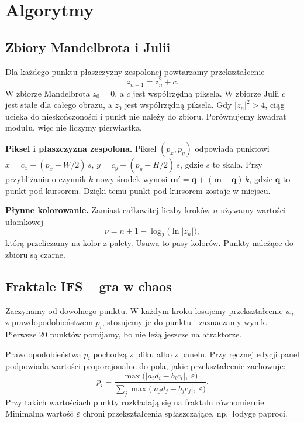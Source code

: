 \documentclass[11pt,a4paper]{article}
\begin{document}
\section{Algorytmy}

\subsection{Zbiory Mandelbrota i Julii}

Dla każdego punktu płaszczyzny zespolonej powtarzamy przekształcenie
\[
  z_{n+1} = z_n^2 + c .
\]
W zbiorze Mandelbrota $z_0 = 0$, a $c$ jest współrzędną piksela. W zbiorze
Julii $c$ jest stałe dla całego obrazu, a $z_0$ jest współrzędną piksela.
Gdy $|z_n|^2 > 4$, ciąg ucieka do nieskończoności i punkt nie należy do zbioru.
Porównujemy kwadrat modułu, więc nie liczymy pierwiastka.

\textbf{Piksel i płaszczyzna zespolona.} Piksel $(p_x, p_y)$ odpowiada
punktowi $x = c_x + (p_x - W/2)\,s$, $y = c_y - (p_y - H/2)\,s$, gdzie $s$ to
skala. Przy przybliżaniu o czynnik $k$ nowy środek wynosi
$\mathbf{m}' = \mathbf{q} + (\mathbf{m} - \mathbf{q})\,k$, gdzie $\mathbf{q}$
to punkt pod kursorem. Dzięki temu punkt pod kursorem zostaje w miejscu.

\textbf{Płynne kolorowanie.} Zamiast całkowitej liczby kroków $n$ używamy
wartości ułamkowej
\[
  \nu = n + 1 - \log_2\bigl(\ln |z_n|\bigr),
\]
którą przeliczamy na kolor z palety. Usuwa to pasy kolorów. Punkty należące
do zbioru są czarne.

\subsection{Fraktale IFS -- gra w chaos}
\label{sec:ifs}

Zaczynamy od dowolnego punktu. W każdym kroku losujemy przekształcenie $w_i$
z prawdopodobieństwem $p_i$, stosujemy je do punktu i zaznaczamy wynik.
Pierwsze 20 punktów pomijamy, bo nie leżą jeszcze na atraktorze.

Prawdopodobieństwa $p_i$ pochodzą z pliku albo z panelu. Przy ręcznej edycji
panel podpowiada wartości proporcjonalne do pola, jakie przekształcenie
zachowuje:
\[
  p_i = \frac{\max\bigl(|a_i d_i - b_i c_i|,\ \varepsilon\bigr)}
             {\sum_j \max\bigl(|a_j d_j - b_j c_j|,\ \varepsilon\bigr)} .
\]
Przy takich wartościach punkty rozkładają się na fraktalu równomiernie.
Minimalna wartość $\varepsilon$ chroni przekształcenia spłaszczające,
np.\ łodygę paproci.
\end{document}
